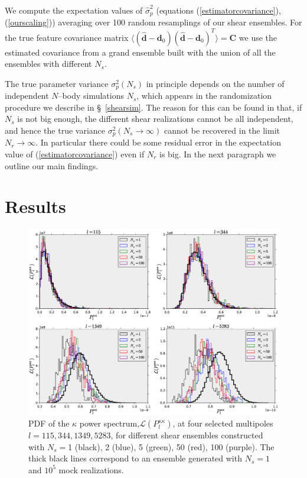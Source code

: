 \documentclass[reprint,aps,prd,superscriptaddress,showkeys,showpacs]{revtex4-1}
\newcommand{\bb}[1]{\mathbf{#1}}
\newcommand{\bbh}[1]{\mathbf{\hat{#1}}}
\newcommand{\h}[1]{\hat{#1}}
\begin{document}
We compute the expectation values of $\h{\sigma}^2_p$ (equations (\ref{estimatorcovariance}),(\ref{ourscaling})) averaging over 100 random resamplings of our shear ensembles. For the true feature covariance matrix $\langle(\bbh{d}-\bb{d}_0)(\bbh{d}-\bb{d}_0)^T\rangle=\bb{C}$ we use the estimated covariance from a grand ensemble built with the union of all the ensembles with different $N_s$. 

The true parameter variance $\sigma^2_p(N_s)$ in principle depends on the number of independent $N$--body simulations $N_s$, which appears in the randomization procedure we describe in \S~\ref{shearsim}. The reason for this can be found in that, if $N_s$ is not big enough, the different shear realizations cannot be all independent, and hence the true variance $\sigma^2_p(N_s\rightarrow\infty)$ cannot be recovered in the limit $N_r\rightarrow\infty$. In particular there could be some residual error in the expectation value of (\ref{estimatorcovariance}) even if $N_r$ is big. In the next paragraph we outline our main findings.
 


\section{Results}

\begin{figure}
\includegraphics[scale=0.4]{Figures/ps_pdf.eps}
\caption{PDF of the $\kappa$ power spectrum,$\mathcal{L}(P_l^{\kappa\kappa})$, at four selected multipoles $l=115,344,1349,5283$, for different shear ensembles constructed with $N_s=$1 (black), 2 (blue), 5 (green), 50 (red), 100 (purple). The thick black lines correspond to an ensemble generated with $N_s=1$ and $10^5$ mock realizations.}
\label{ps_pdf}
\end{figure}
\end{document}
